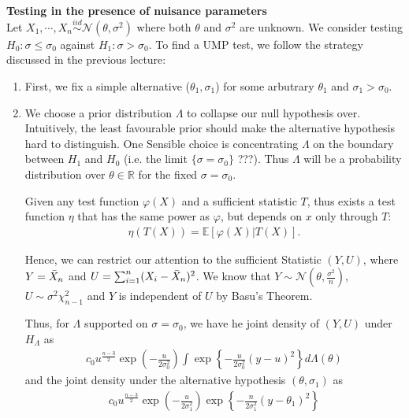 \begin{example}
    \textbf{Testing in the presence of nuisance parameters}\\
    Let $X_1,\cdots,X_n\overset{iid}{\sim}\mathcal{N}(\theta,\sigma^2)$
    where both $\theta$ and $\sigma^2$ are unknown.
    We consider testing $H_0:\sigma\leq\sigma_0$ against $H_1:\sigma>\sigma_0$.
    To find a UMP test,
    we follow the strategy discussed in the previous lecture:
    \begin{enumerate}
        \item First, we fix a simple alternative ($\theta_1,\sigma_1$) for some arbutrary $\theta_1$ and $\sigma_1>\sigma_0$.
        \item We choose a prior distribution $\Lambda$ to collapse our null hypothesis over.
        Intuitively, the least favourable prior should make the alternative hypothesis hard to distinguish.
        One Sensible choice is concentrating $\Lambda$ on the boundary between $H_1$ and $H_0$
        (i.e. the limit $\{\sigma=\sigma_0\}$ ???).
        Thus $\Lambda$ will be a probability distribution over $\theta\in\mathbb{R}$ for the fixed $\sigma=\sigma_0$.
        
        Given any test function $\varphi(X)$ and a sufficient statistic $T$,
        thus exists a test function $\eta$ that has the same power as $\varphi$,
        but depends on $x$ only through $T$:
        \begin{gather}
            \eta(T(X))=\mathbb{E}[\varphi(X)|T(X)].
        \end{gather}

        Hence, we can restrict our attention to the sufficient Statistic $(Y,U)$,
        where $Y=\Bar{X}_n$ and $U=\sum_{i=1}^n(X_i-\Bar{X}_n)^2$.
        We know that $Y\sim\mathcal{N}(\theta,\frac{\sigma^2}{n})$,
        $U\sim\sigma^2\chi^2_{n-1}$ and $Y$ is independent of $U$ by Basu's Theorem.

        Thus, for $\Lambda$ supported on $\sigma=\sigma_0$,
        we have he joint density of $(Y,U)$ under $H_\Lambda$ as 
        \begin{gather}
            c_0 u^\frac{n-3}{2} \exp\left( -\frac{u}{2\sigma_0^2} \right)
            \int\exp\left\{ -\frac{u}{2\sigma_0^2}(y-u)^2 \right\}d\Lambda(\theta) \label{eq:comph01}
        \end{gather}
        and the joint density under the alternative hypothesis $(\theta,\sigma_1)$ as 
        \begin{gather}
            c_0 u^\frac{n-3}{2} \exp\left( -\frac{u}{2\sigma_1^2} \right)
            \exp\left\{ -\frac{n}{2\sigma_1^2}(y-\theta_1)^2 \right\}\label{eq:comph02}
        \end{gather}
        

\end{enumerate}
\end{example}
